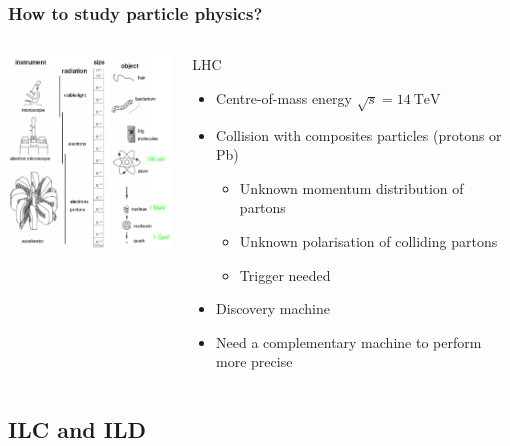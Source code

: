 \documentclass{beamer}
\begin{document}
  \begin{frame}
    \frametitle{How to study particle physics?}

    \begin{columns}[c]
      \begin{column}{5cm}
        \centering
        \includegraphics[width = 5cm]{Pictures/instrument.png}
      \end{column}
      \begin{column}{5cm}
        \begin{block}{LHC}
          \begin{itemize}
            \item Centre-of-mass energy $\sqrt{s} = 14~\text{TeV}$
            \item Collision with composites particles (protons or Pb)
                \begin{itemize}
                    \item Unknown momentum distribution of partons
                    \item Unknown polarisation of colliding partons
                    \item Trigger needed
                \end{itemize}
            \item Discovery machine
            \item Need a complementary machine to perform more precise
          \end{itemize}
        \end{block}
      \end{column}
    \end{columns}
  \end{frame}
    
    \subsection{ILC and ILD}
\end{document}
